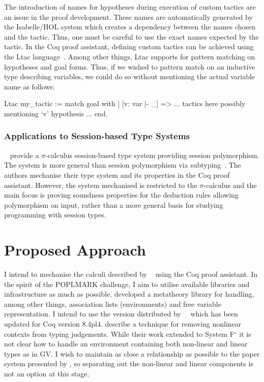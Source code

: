 \documentclass{mprop}
\newcommand{\fpop}{System F${}^\circ$\xspace}
\begin{document}
The introduction of names for hypotheses during execution of custom tactics are an issue in the proof development. These names are automatically generated by the Isabelle/HOL system which creates a dependency between the names chosen and the tactic. Thus, one must be careful to use the exact names expected by the tactic. In the Coq proof assistant, defining custom tactics can be achieved using the Ltac language~\cite{Delahaye:2000:TLS}. Among other things, Ltac supports for pattern matching on hypotheses and goal forms. Thus, if we wished to pattern match on an inductive type describing variables, we could do so without mentioning the actual variable name as follows:

\begin{coq}
Ltac my_tactic :=
  match goal with
  | [v: var |- _] => ... tactics here possibly mentioning `v' hypothesis ...
  end.
\end{coq}

\subsubsection{Applications to Session-based Type Systems}\label{sec:asts}

\citeauthor{Goto:2014}~\cite{Goto:2014} provide a $\pi$-calculus session-based type system providing session polymorphism. The system is more general than session polymorphism via subtyping~\cite{Gay:2005:SST}. The authors mechanise their type system and its properties in the Coq proof assistant. However, the system mechanised is restricted to the $\pi$-calculus and the main focus is proving soundness properties for the deduction rules allowing polymorphism on input, rather than a more general basis for studying programming with session types.

\section{Proposed Approach}\label{sec:approach}


I intend to mechanise the calculi described by \citeauthor{Wadler:2012}~\cite{Wadler:2012} using the Coq proof assistant. In the spirit of the POPLMARK challenge, I aim to utilise available libraries and infrastructure as much as possible. \citeauthor{Aydemir:2008:EFM} developed a metatheory library for handling, among other things, association lists (environments) and free variable representation. I intend to use the version distributed by~\citeauthor{Park:2014:MMW}~\cite{Park:2014:MMW} which has been updated for Coq version 8.4pl4. \citeauthor{Park:2014:MMW} describe a technique for removing nonlinear contexts from typing judgements. While their work extended to \fpop it is not clear how to handle an environment containing both non-linear and linear types as in GV. I wish to maintain as close a relationship as possible to the paper system presented by \citeauthor{Wadler:2012}, so separating out the non-linear and linear components is not an option at this stage.
\end{document}
